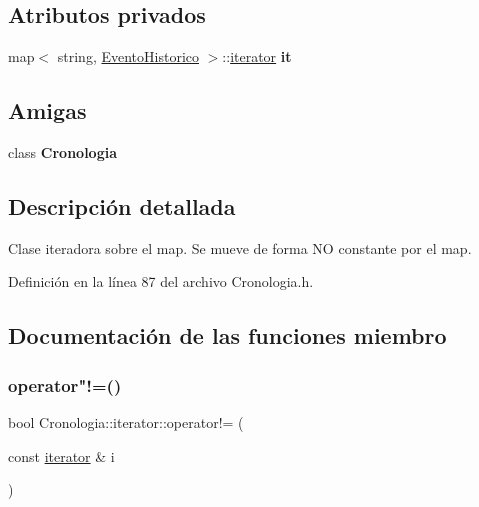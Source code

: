 \subsection*{Atributos privados}
\begin{DoxyCompactItemize}
\item 
\hypertarget{classCronologia_1_1iterator_a86eb1a85a2d374e55f2d6e2c7db1e30a}{}\label{classCronologia_1_1iterator_a86eb1a85a2d374e55f2d6e2c7db1e30a} 
map$<$ string, \hyperlink{classEventoHistorico}{Evento\+Historico} $>$\+::\hyperlink{classCronologia_1_1iterator}{iterator} {\bfseries it}
\end{DoxyCompactItemize}
\subsection*{Amigas}
\begin{DoxyCompactItemize}
\item 
\hypertarget{classCronologia_1_1iterator_a093d6c964b7fcfece8a1bef43b5bc9ad}{}\label{classCronologia_1_1iterator_a093d6c964b7fcfece8a1bef43b5bc9ad} 
class {\bfseries Cronologia}
\end{DoxyCompactItemize}


\subsection{Descripción detallada}
Clase iteradora sobre el map. Se mueve de forma NO constante por el map. 

Definición en la línea 87 del archivo Cronologia.\+h.



\subsection{Documentación de las funciones miembro}
\hypertarget{classCronologia_1_1iterator_a83f40e155be2697a41943a45789ec1ec}{}\label{classCronologia_1_1iterator_a83f40e155be2697a41943a45789ec1ec} 
\subsubsection{\texorpdfstring{operator"!=()}{operator!=()}}
{\footnotesize\ttfamily bool Cronologia\+::iterator\+::operator!= (\begin{DoxyParamCaption}\item[{const \hyperlink{classCronologia_1_1iterator}{iterator} \&}]{i }\end{DoxyParamCaption})\hspace{0.3cm}{\ttfamily [inline]}}



